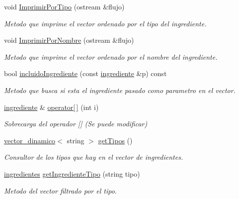 \begin{DoxyCompactItemize}
void \hyperlink{classingredientes_a683d032576cbc230c210aa51cdbcc93e}{Imprimir\+Por\+Tipo} (ostream \&flujo)
\begin{DoxyCompactList}\small\item\em Metodo que imprime el vector ordenado por el tipo del ingrediente. \end{DoxyCompactList}\item 
void \hyperlink{classingredientes_adefafd151edf8a8997bca2dc22057ece}{Imprimir\+Por\+Nombre} (ostream \&flujo)
\begin{DoxyCompactList}\small\item\em Metodo que imprime el vector ordenado por el nombre del ingrediente. \end{DoxyCompactList}\item 
bool \hyperlink{classingredientes_a6d3f30e2e79299a970c705f61a8ee4d7}{incluido\+Ingrediente} (const \hyperlink{classingrediente}{ingrediente} \&p) const
\begin{DoxyCompactList}\small\item\em Metodo que busca si esta el ingrediente pasado como parametro en el vector. \end{DoxyCompactList}\item 
\hyperlink{classingrediente}{ingrediente} \& \hyperlink{classingredientes_a9e099786f83d0ac3cf38317b194691db}{operator\mbox{[}$\,$\mbox{]}} (int i)
\begin{DoxyCompactList}\small\item\em Sobrecarga del operador \mbox{[}\mbox{]} (Se puede modificar) \end{DoxyCompactList}\item 
\hyperlink{classvector__dinamico}{vector\+\_\+dinamico}$<$ string $>$ \hyperlink{classingredientes_a4fc149d674b55f73c3079d58606e7e1c}{get\+Tipos} ()
\begin{DoxyCompactList}\small\item\em Consultor de los tipos que hay en el vector de ingredientes. \end{DoxyCompactList}\item 
\hyperlink{classingredientes}{ingredientes} \hyperlink{classingredientes_a160ecb07facb16cbe7369ea797c67549}{get\+Ingrediente\+Tipo} (string tipo)
\begin{DoxyCompactList}\small\item\em Metodo del vector filtrado por el tipo. \end{DoxyCompactList}\item 
\mbox{\label{classingredientes_aa124bb75b0ff0b233d313fce58668868}} 

\end{DoxyCompactItemize}
